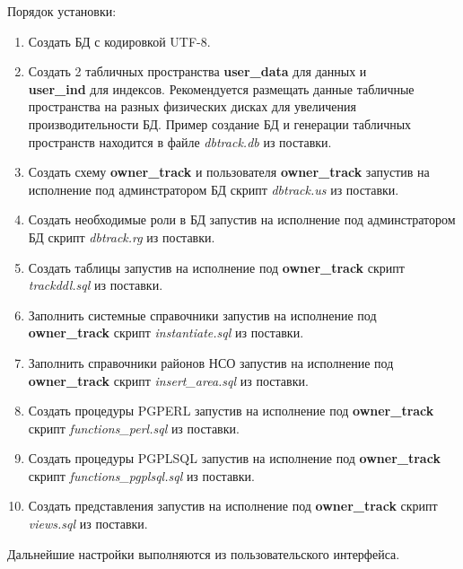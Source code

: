 \documentclass[12pt,a4paper]{article}
\begin{document}
Порядок установки:
\begin{enumerate}
\item Создать БД с кодировкой UTF-8.
\item Создать 2 табличных пространства \textbf{user\_data} для данных и \\ \textbf{user\_ind} для индексов. Рекомендуется размещать данные табличные пространства на разных физических дисках для увеличения производительности БД. 
Пример создание БД и генерации табличных пространств находится в файле \textit{dbtrack.db} из поставки.
\item Создать схему \textbf{owner\_track} и пользователя \textbf{owner\_track} запустив на исполнение под админстратором БД скрипт \textit{dbtrack.us} из поставки.
\item Создать необходимые роли в БД запустив на исполнение под админстратором БД скрипт \textit{dbtrack.rg} из поставки.
\item Создать таблицы запустив на исполнение под \textbf{owner\_track} скрипт \textit{trackddl.sql} из поставки.
\item Заполнить системные справочники запустив на исполнение под \textbf{owner\_track} скрипт \textit{instantiate.sql} из поставки.
\item Заполнить справочники районов НСО запустив на исполнение под \textbf{owner\_track} скрипт \textit{insert\_area.sql} из поставки.
\item Создать процедуры PGPERL запустив на исполнение под \textbf{owner\_track} скрипт \textit{functions\_perl.sql} из поставки.
\item Создать процедуры PGPLSQL запустив на исполнение под \textbf{owner\_track} скрипт \textit{functions\_pgplsql.sql} из поставки.
\item Создать представления запустив на исполнение под \textbf{owner\_track} скрипт \textit{views.sql} из поставки.

\end{enumerate}

Дальнейшие настройки выполняются из пользовательского интерфейса.
\end{document}
